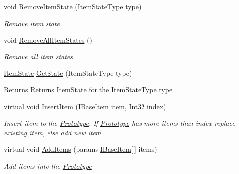 \begin{DoxyCompactItemize}
void \mbox{\hyperlink{class_space_v_i_l_1_1_prototype_a2c7109a2346956afe3e03958e6d2701c}{Remove\+Item\+State}} (Item\+State\+Type type)
\begin{DoxyCompactList}\small\item\em Remove item state \end{DoxyCompactList}\item 
void \mbox{\hyperlink{class_space_v_i_l_1_1_prototype_ac5b68167a1e8160c1af3033f94e80858}{Remove\+All\+Item\+States}} ()
\begin{DoxyCompactList}\small\item\em Remove all item states \end{DoxyCompactList}\item 
\mbox{\label{class_space_v_i_l_1_1_prototype_a6d80da4133973f688c951beb724ad862}} 
\mbox{\hyperlink{class_space_v_i_l_1_1_decorations_1_1_item_state}{Item\+State}} \mbox{\hyperlink{class_space_v_i_l_1_1_prototype_a6d80da4133973f688c951beb724ad862}{Get\+State}} (Item\+State\+Type type)
\begin{DoxyCompactList}\small\item\em \begin{DoxyReturn}{Returns}
Returns Item\+State for the Item\+State\+Type type 
\end{DoxyReturn}
\end{DoxyCompactList}\item 
virtual void \mbox{\hyperlink{class_space_v_i_l_1_1_prototype_a9dd004dfa4ca2ea37c21770a24434270}{Insert\+Item}} (\mbox{\hyperlink{interface_space_v_i_l_1_1_core_1_1_i_base_item}{I\+Base\+Item}} item, Int32 index)
\begin{DoxyCompactList}\small\item\em Insert item to the \mbox{\hyperlink{class_space_v_i_l_1_1_prototype}{Prototype}}. If \mbox{\hyperlink{class_space_v_i_l_1_1_prototype}{Prototype}} has more items than index replace existing item, else add new item \end{DoxyCompactList}\item 
virtual void \mbox{\hyperlink{class_space_v_i_l_1_1_prototype_a41f1a65df4f13b958dfdab342266a357}{Add\+Items}} (params \mbox{\hyperlink{interface_space_v_i_l_1_1_core_1_1_i_base_item}{I\+Base\+Item}}\mbox{[}$\,$\mbox{]} items)
\begin{DoxyCompactList}\small\item\em Add items into the \mbox{\hyperlink{class_space_v_i_l_1_1_prototype}{Prototype}} \end{DoxyCompactList}\item 

\end{DoxyCompactItemize}
